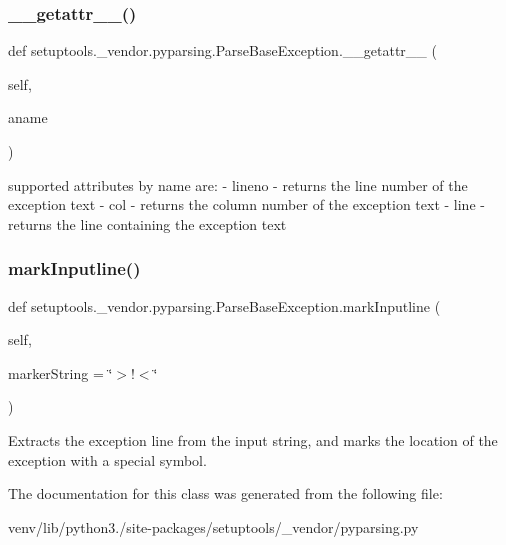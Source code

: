 \subsubsection{\texorpdfstring{\+\_\+\+\_\+getattr\+\_\+\+\_\+()}{\_\_getattr\_\_()}}
{\footnotesize\ttfamily def setuptools.\+\_\+vendor.\+pyparsing.\+Parse\+Base\+Exception.\+\_\+\+\_\+getattr\+\_\+\+\_\+ (\begin{DoxyParamCaption}\item[{}]{self,  }\item[{}]{aname }\end{DoxyParamCaption})}

\begin{DoxyVerb}supported attributes by name are:
    - lineno - returns the line number of the exception text
    - col - returns the column number of the exception text
    - line - returns the line containing the exception text
\end{DoxyVerb}
 \mbox{\label{classsetuptools_1_1__vendor_1_1pyparsing_1_1_parse_base_exception_a81fc1da0dca348299a5f0b628550d8f0}} 
\subsubsection{\texorpdfstring{mark\+Inputline()}{markInputline()}}
{\footnotesize\ttfamily def setuptools.\+\_\+vendor.\+pyparsing.\+Parse\+Base\+Exception.\+mark\+Inputline (\begin{DoxyParamCaption}\item[{}]{self,  }\item[{}]{marker\+String = {\ttfamily \char`\"{}$>$!$<$\char`\"{}} }\end{DoxyParamCaption})}

\begin{DoxyVerb}Extracts the exception line from the input string, and marks
   the location of the exception with a special symbol.
\end{DoxyVerb}
 

The documentation for this class was generated from the following file\+:\begin{DoxyCompactItemize}
\item 
venv/lib/python3./site-\/packages/setuptools/\+\_\+vendor/pyparsing.\+py\end{DoxyCompactItemize}
